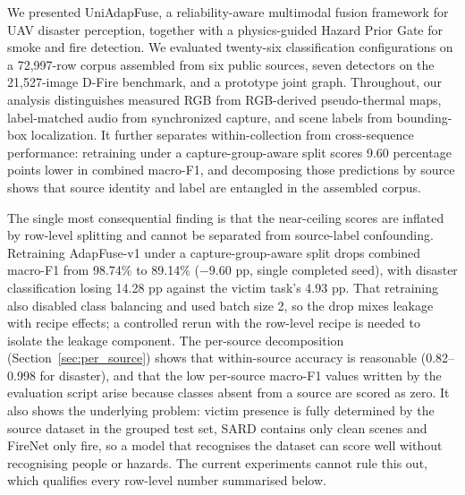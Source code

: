 
We presented UniAdapFuse, a reliability-aware multimodal fusion framework for UAV disaster perception, together with a physics-guided Hazard Prior Gate for smoke and fire detection. We evaluated twenty-six classification configurations on a 72{,}997-row corpus assembled from six public sources, seven detectors on the 21{,}527-image D-Fire benchmark, and a prototype joint graph. Throughout, our analysis distinguishes measured RGB from RGB-derived pseudo-thermal maps, label-matched audio from synchronized capture, and scene labels from bounding-box localization. It further separates within-collection from cross-sequence performance: retraining under a capture-group-aware split scores 9.60 percentage points lower in combined macro-F1, and decomposing those predictions by source shows that source identity and label are entangled in the assembled corpus.

The single most consequential finding is that the near-ceiling scores are inflated by row-level splitting and cannot be separated from source-label confounding. Retraining AdapFuse-v1 under a capture-group-aware split drops combined macro-F1 from 98.74\% to 89.14\% ($-9.60$ pp, single completed seed), with disaster classification losing 14.28 pp against the victim task's 4.93 pp. That retraining also disabled class balancing and used batch size 2, so the drop mixes leakage with recipe effects; a controlled rerun with the row-level recipe is needed to isolate the leakage component. The per-source decomposition (Section~\ref{sec:per_source}) shows that within-source accuracy is reasonable (0.82--0.998 for disaster), and that the low per-source macro-F1 values written by the evaluation script arise because classes absent from a source are scored as zero. It also shows the underlying problem: victim presence is fully determined by the source dataset in the grouped test set, SARD contains only clean scenes and FireNet only fire, so a model that recognises the dataset can score well without recognising people or hazards. The current experiments cannot rule this out, which qualifies every row-level number summarised below.


